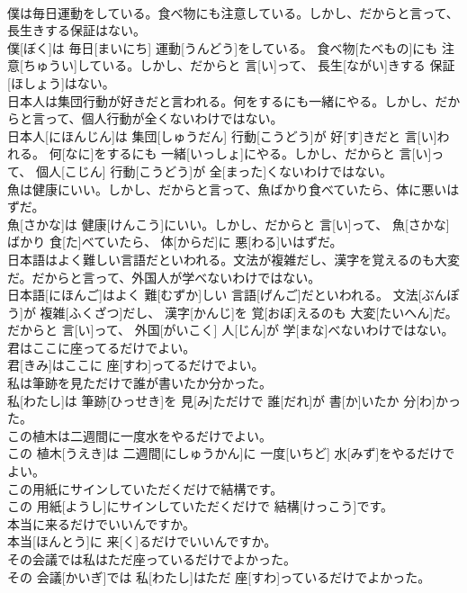 \documentclass[8pt]{extreport}
\begin{document}
\begin{CJK}{UTF8}{min}
\\	僕は毎日運動をしている。食べ物にも注意している。しかし、だからと言って、長生きする保証はない。	
\\	僕[ぼく]は 毎日[まいにち] 運動[うんどう]をしている。 食べ物[たべもの]にも 注意[ちゅうい]している。しかし、だからと 言[い]って、 長生[ながい]きする 保証[ほしょう]はない。
\\	日本人は集団行動が好きだと言われる。何をするにも一緒にやる。しかし、だからと言って、個人行動が全くないわけではない。	
\\	日本人[にほんじん]は 集団[しゅうだん] 行動[こうどう]が 好[す]きだと 言[い]われる。 何[なに]をするにも 一緒[いっしょ]にやる。しかし、だからと 言[い]って、 個人[こじん] 行動[こうどう]が 全[まった]くないわけではない。
\\	魚は健康にいい。しかし、だからと言って、魚ばかり食べていたら、体に悪いはずだ。	
\\	魚[さかな]は 健康[けんこう]にいい。しかし、だからと 言[い]って、 魚[さかな]ばかり 食[た]べていたら、 体[からだ]に 悪[わる]いはずだ。
\\	日本語はよく難しい言語だといわれる。文法が複雑だし、漢字を覚えるのも大変だ。だからと言って、外国人が学べないわけではない。	
\\	日本語[にほんご]はよく 難[むずか]しい 言語[げんご]だといわれる。 文法[ぶんぽう]が 複雑[ふくざつ]だし、 漢字[かんじ]を 覚[おぼ]えるのも 大変[たいへん]だ。だからと 言[い]って、 外国[がいこく] 人[じん]が 学[まな]べないわけではない。
\\	君はここに座ってるだけでよい。	
\\	君[きみ]はここに 座[すわ]ってるだけでよい。
\\	私は筆跡を見ただけで誰が書いたか分かった。	
\\	私[わたし]は 筆跡[ひっせき]を 見[み]ただけで 誰[だれ]が 書[か]いたか 分[わ]かった。
\\	この植木は二週間に一度水をやるだけでよい。	
\\	この 植木[うえき]は 二週間[にしゅうかん]に 一度[いちど] 水[みず]をやるだけでよい。
\\	この用紙にサインしていただくだけで結構です。	
\\	この 用紙[ようし]にサインしていただくだけで 結構[けっこう]です。
\\	本当に来るだけでいいんですか。	
\\	本当[ほんとう]に 来[く]るだけでいいんですか。
\\	その会議では私はただ座っているだけでよかった。	
\\	その 会議[かいぎ]では 私[わたし]はただ 座[すわ]っているだけでよかった。

\end{CJK}
\end{document}
